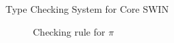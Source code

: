 \begin{section}{Type Checking System for Core SWIN}
\begin{figure}[htb!]


\begin{center}
\DP
\end{center}
\vspace{2pt}
\caption{Checking rule for $\pi$}
\label{typerules}
\end{figure}

\newcommand{\indentspace}{~~~~~~~~}


\end{section}

